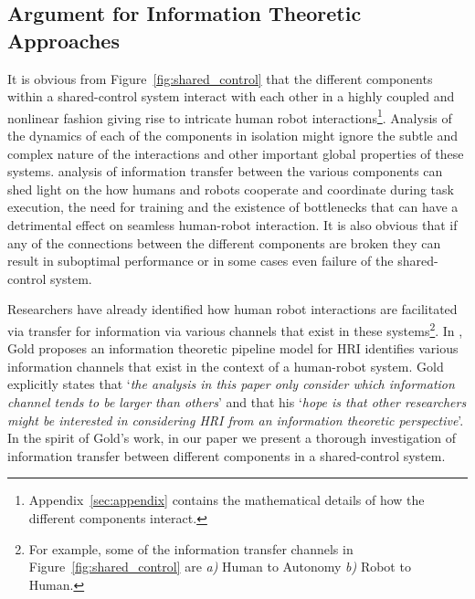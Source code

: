 \documentclass[letterpaper, 10 pt, conference]{ieeeconf}  %
\begin{document}
\subsection{Argument for Information Theoretic Approaches}
It is obvious from Figure~\ref{fig:shared_control} that the different components within a shared-control system interact with each other in a highly coupled and nonlinear fashion giving rise to intricate human robot interactions\footnote{Appendix~\ref{sec:appendix} contains the mathematical details of how the different components interact.}. Analysis of the dynamics of each of the components in isolation might ignore the subtle and complex nature of the interactions and other important global properties of these systems. analysis of information transfer between the various components can shed light on the how humans and robots cooperate and coordinate during task execution, the need for training and the existence of bottlenecks that can have a detrimental effect on seamless human-robot interaction. It is also obvious that if any of the connections between the different components are broken they can result in suboptimal performance or in some cases even failure of the shared-control system. 

Researchers have already identified how human robot interactions are facilitated via transfer for information via various channels that exist in these systems\footnote{For example, some of the information transfer channels in Figure~\ref{fig:shared_control} are \textit{a)} Human to Autonomy \textit{b)} Robot to Human.}. In \cite{gold2009information}, Gold proposes an information theoretic pipeline model for HRI  identifies various information channels that exist in the context of a human-robot system. Gold explicitly states that `\textit{the analysis in this paper only consider which information channel tends to be larger than others}' and that his `\textit{hope is that other researchers might be interested in considering HRI from an information theoretic perspective}'. In the spirit of Gold's work, in our paper we present a thorough investigation of information transfer between different components in a shared-control system. 

%
\end{document}
